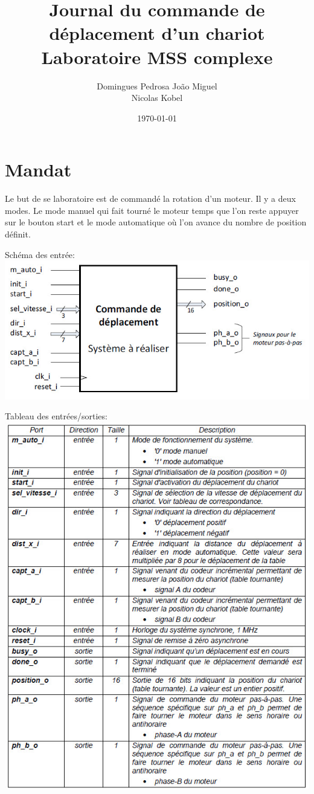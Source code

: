 \documentclass[10pt,a4paper]{article}
\author{Domingues Pedrosa João Miguel \\ Nicolas Kobel}
\title{Journal du commande de déplacement d'un chariot 
\\Laboratoire MSS complexe}
\date{\today}
\begin{document}
\maketitle
\newpage
\tableofcontents
\newpage

\section{Mandat}
Le but de se laboratoire est de commandé la rotation d'un moteur. Il y a deux modes. Le mode manuel qui fait tourné le moteur temps que l'on reste appuyer sur le bouton start et le mode automatique où l'on avance du nombre de position définit.

Schéma des entrée:\\
\includegraphics[scale=0.5]{images/schema_entree.jpg}

Tableau des entrées/sorties:\\
\includegraphics[scale=0.5]{images/tableau.jpg}
\end{document}
